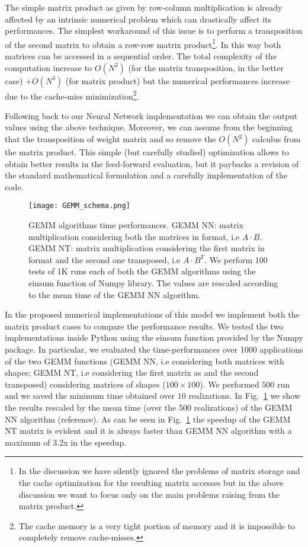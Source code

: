 \documentclass{standalone}
\begin{document}
The simple matrix product as given by row-column multiplication is already affected by an intrinsic numerical problem which can drastically affect its performances.
The simplest workaround of this issue is to perform a transposition of the second matrix to obtain a row-row matrix product\footnote{
  In the discussion we have silently ignored the problems of matrix storage and the cache optimization for the resulting matrix accesses but in the above discussion we want to focus only on the main problems raising from the matrix product.
}.
In this way both matrices can be accessed in a sequential order.
The total complexity of the computation increase to $O(N^2)$ (for the matrix transposition, in the better case) $+ O(N^3)$ (for matrix product) but the numerical performances increase due to the cache-miss minimization\footnote{
  The cache memory is a very tight portion of memory and it is impossible to completely remove cache-misses.
}.

Following back to our Neural Network implementation we can obtain the output values using the above technique.
Moreover, we can assume from the beginning that the transposition of weight matrix and so remove the $O(N^2)$ calculus from the matrix product.
This simple (but carefully studied) optimization allows to obtain better results in the feed-forward evaluation, but it paybacks a revision of the standard mathematical formulation and a carefully implementation of the code.

\begin{figure}[htbp]
\texttt{[image: GEMM\_schema.png]}
\quad
\centering
\def\svgwidth{0.45\textwidth}

\caption{GEMM algorithms time performances.
\textsf{GEMM NN}: matrix multiplication considering both the matrices in  format, i.e $A\cdot B$.
\textsf{GEMM NT}: matrix multiplication considering the first matrix in  format and the second one transposed, i.e $A\cdot B^T$.
We perform 100 tests of 1K runs each of both the \textsf{GEMM} algorithms using the \textsf{einsum} function of \textsf{Numpy} library.
The values are rescaled according to the mean time of the \textsf{GEMM NN} algorithm.
}
\label{fig:gemm}
\end{figure}

In the proposed numerical implementations of this model we implement both the matrix product cases to compare the performance results.
We tested the two implementations inside \textsf{Python} using the \textsf{einsum} function provided by the \textsf{Numpy} package.
In particular, we evaluated the time-performances over 1000 applications of the two \textsf{GEMM} functions (\textsf{GEMM NN}, i.e considering both matrices with  shapes; \textsf{GEMM NT}, i.e considering the first matrix as  and the second transposed) considering matrices of shapes ($100\times100$).
We performed $500$ run and we saved the minimum time obtained over $10$ realizations.
In Fig.~\ref{fig:gemm} we show the results rescaled by the mean time (over the 500 realizations) of the \textsf{GEMM NN} algorithm (reference).
As can be seen in Fig.~\ref{fig:gemm} the speedup of the \textsf{GEMM NT} matrix is evident and it is always faster than \textsf{GEMM NN} algorithm with a maximum of $3.2$x in the speedup.
\end{document}
